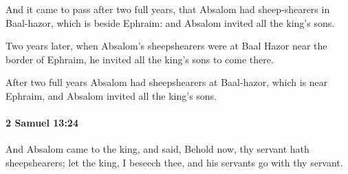 			\begin{versebox}
					\item[BHS] 
					\item[ASV] And it came to pass after two full years, that Absalom had sheep-shearers in Baal-hazor, which is beside Ephraim: and Absalom invited all the king's sons.
					\item[NIV] Two years later, when Absalom’s sheepshearers were at Baal Hazor near the border of Ephraim, he invited all the king’s sons to come there.
					\item[NRSV] After two full years Absalom had sheepshearers at Baal-hazor, which is near Ephraim, and Absalom invited all the king’s sons.
			\end{versebox}

		\paragraph{2 Samuel 13:24} %
			\label{2SAMUEL-13-24}

			And Absalom came to the king, and said, Behold now, thy servant hath sheepshearers; let the king, I beseech thee, and his servants go with thy servant.

